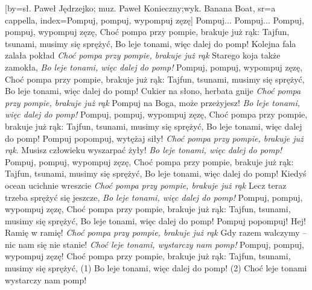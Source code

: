 [by={sł. Paweł Jędrzejko; muz. Paweł Konieczny;\break wyk. Banana Boat},
    sr={a cappella},
    index={Pompuj, pompuj, wypompuj zęzę}]
\beginchorus
Pompuj... Pompuj...
\endchorus
\beginchorus
Pompuj, pompuj, wypompuj zęzę,
Choć pompa przy pompie, brakuje już rąk:
Tajfun, tsunami, musimy się sprężyć,
Bo leje tonami, więc dalej do pomp!
\endchorus
\beginverse
Kolejna fala zalała pokład
\textit{Choć pompa przy pompie, brakuje już rąk}
Starego koja także zamokła,
\textit{Bo leje tonami, więc dalej do pomp!}
\endverse
\ifphone
\beginchorus
Pompuj, pompuj, wypompuj zęzę,
Choć pompa przy pompie, brakuje już rąk:
Tajfun, tsunami, musimy się sprężyć,
Bo leje tonami, więc dalej do pomp!
\endchorus
\fi
\beginverse
Cukier na słono, herbata gnije
\textit{Choć pompa przy pompie, brakuje już rąk}
Pompuj na Boga, może przeżyjesz!
\textit{Bo leje tonami, więc dalej do pomp!}
\endverse
\ifphone
\beginchorus
Pompuj, pompuj, wypompuj zęzę,
Choć pompa przy pompie, brakuje już rąk:
Tajfun, tsunami, musimy się sprężyć,
Bo leje tonami, więc dalej do pomp!
\endchorus
\fi
\beginverse
Pompuj popompuj, wytężaj siły!
\textit{Choć pompa przy pompie, brakuje już rąk}.
Musisz człowieku wyszarpać żyły!
\textit{Bo leje tonami, więc dalej do pomp!}
\endverse
\ifphone
\beginchorus
Pompuj, pompuj, wypompuj zęzę,
Choć pompa przy pompie, brakuje już rąk:
Tajfun, tsunami, musimy się sprężyć,
Bo leje tonami, więc dalej do pomp!
\endchorus
\fi
\beginverse
Kiedyś ocean ucichnie wreszcie
\textit{Choć pompa przy pompie, brakuje już rąk}
Lecz teraz trzeba sprężyć się jeszcze,
\textit{Bo leje tonami, więc dalej do pomp!}
\endverse
\ifphone
\beginchorus
Pompuj, pompuj, wypompuj zęzę,
Choć pompa przy pompie, brakuje już rąk:
Tajfun, tsunami, musimy się sprężyć,
Bo leje tonami, więc dalej do pomp!
\endchorus
\fi
\beginverse
Pompuj popompuj! Hej! Ramię w ramię!
\textit{Choć pompa przy pompie, brakuje już rąk}
Gdy razem walczymy -- nic nam się nie stanie!
\textit{Choć leje tonami, wystarczy nam pomp!}
\endverse
\setcounter{versenum}{2}
\beginchorus
Pompuj, pompuj, wypompuj zęzę!
Choć pompa przy pompie, brakuje już rąk:
Tajfun, tsunami, musimy się sprężyć,
(1) Bo leje tonami, więc dalej do pomp!
(2) Choć leje tonami wystarczy nam pomp!
\endchorus
\endsong
